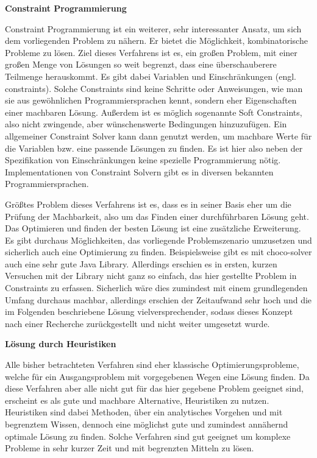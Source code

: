 \textbf{Constraint Programmierung}

Constraint Programmierung ist ein weiterer, sehr interessanter Ansatz, um sich dem vorliegenden Problem zu nähern. Er bietet die Möglichkeit, kombinatorische Probleme zu lösen. Ziel dieses Verfahrens ist es, ein großen Problem, mit einer großen Menge von Lösungen so weit begrenzt, dass eine überschauberere Teilmenge herauskommt. Es gibt dabei Variablen und Einschränkungen (engl. constraints). Solche Constraints sind keine Schritte oder Anweisungen, wie man sie aus gewöhnlichen Programmiersprachen kennt, sondern eher Eigenschaften einer machbaren Lösung. Außerdem ist es möglich sogenannte \glqq{}Soft Constraints\grqq{}, also nicht zwingende, aber wünschenswerte Bedingungen hinzuzufügen. Ein allgemeiner Constraint Solver kann dann genutzt werden, um machbare Werte für die Variablen bzw. eine passende Lösungen zu finden. Es ist hier also neben der Spezifikation von Einschränkungen keine spezielle Programmierung nötig. Implementationen von Constraint Solvern gibt es in diversen bekannten Programmiersprachen. \cite{constraintProgramming}

Größtes Problem dieses Verfahrens ist es, dass es in seiner Basis eher um die Prüfung der Machbarkeit, also um das Finden einer durchführbaren Lösung geht. Das Optimieren und finden der besten Lösung ist eine zusätzliche Erweiterung. \cite{constraintProgramming} Es gibt durchaus Möglichkeiten, das vorliegende Problemszenario umzusetzen und sicherlich auch eine Optimierung zu finden. Beispielsweise gibt es mit \glqq{}choco-solver\grqq{} \cite{chocoSolver} auch eine sehr gute Java Library. Allerdings erschien es in ersten, kurzen Versuchen mit der Library nicht ganz so einfach, das hier gestellte Problem in Constraints zu erfassen. Sicherlich wäre dies zumindest mit einem grundlegenden Umfang durchaus machbar, allerdings erschien der Zeitaufwand sehr hoch und die im Folgenden beschriebene Lösung vielversprechender, sodass dieses Konzept nach einer Recherche zurückgestellt und nicht weiter umgesetzt wurde.


\textbf{Lösung durch Heuristiken}

Alle bisher betrachteten Verfahren sind eher klassische Optimierungsprobleme, welche für ein Ausgangsproblem mit vorgegebenen Wegen eine Lösung finden. Da diese Verfahren aber alle nicht gut für das hier gegebene Problem geeignet sind, erscheint es als gute und machbare Alternative, Heuristiken zu nutzen. Heuristiken sind dabei Methoden, über ein analytisches Vorgehen und mit begrenztem Wissen, dennoch eine möglichst gute und zumindest annähernd optimale Lösung zu finden. Solche Verfahren sind gut geeignet um komplexe Probleme in sehr kurzer Zeit und mit begrenzten Mitteln zu lösen. \cite{heuristicAlgorithms}

